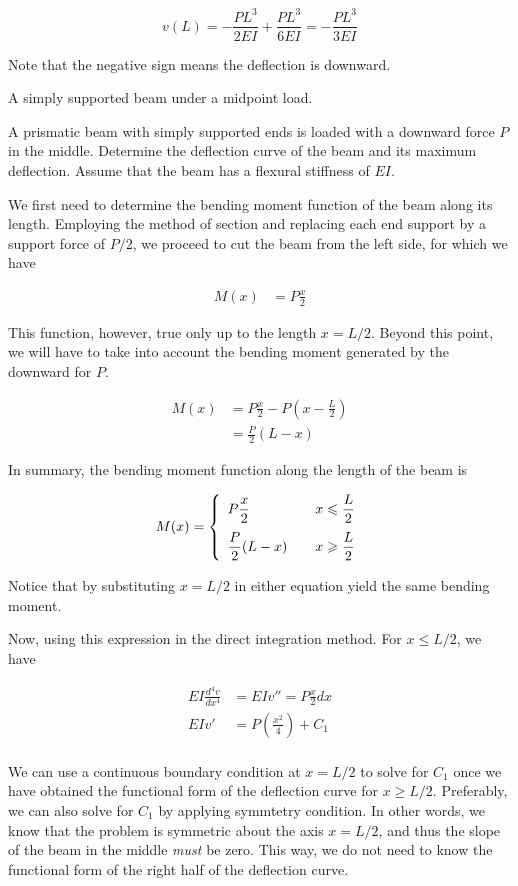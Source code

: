 \documentclass[a4paper,openany,12pt]{book}
\begin{document}
\begin{enumerate}
$$v(L) =  - \frac{PL^3}{2EI} + \frac{PL^3}{6EI} =  - \frac{PL^3}{3EI}$$

Note that the negative sign means the deflection is downward.

A simply supported beam under a midpoint load.

A prismatic beam with simply supported ends is loaded with a downward
force \(P\) in the middle. Determine the deflection curve of the beam and
its maximum deflection. Assume that the beam has a flexural stiffness of
\(EI\).


We first need to determine the bending moment function of the beam along
its length. Employing the method of section and replacing each end
support by a support force of \(P/2\), we proceed to cut the beam from the
left side, for which we have

$$\begin{aligned}
    M(x) &= P\frac{x}{2}
  \end{aligned}$$

This function, however, true only up to the length \(x = L/2\). Beyond
this point, we will have to take into account the bending moment
generated by the downward for \(P\).

$$\begin{aligned}
    M(x) &= P\frac{x}{2} - P(x-\frac{L}{2}) \\
         &= \frac{P}{2}(L-x)
  \end{aligned}$$

In summary, the bending moment function along the length of the beam is

$$M(x) = \left\{
      \begin{array}{l l l}
        P\dfrac{x}{2} & & x \leqslant \dfrac{L}{2} \\[1em]
        \dfrac{P}{2}(L-x) & & x \geqslant \dfrac{L}{2}
      \end{array} \right.$$

Notice that by substituting \(x = L/2\) in either equation yield the same
bending moment.

Now, using this expression in the direct integration method. For
\(x \leqslant L/2\), we have

$$\begin{aligned}
    EI \frac{d^4v}{dx^4} &= EIv'' = P\frac{x}{2}dx \\
    EIv' &= P (\frac{x^2}{4}) + C_1 \\
  \end{aligned}$$

We can use a continuous boundary condition at \(x = L/2\) to solve for
\(C_1\) once we have obtained the functional form of the deflection curve
for \(x \geqslant L/2\). Preferably, we can also solve for \(C_1\) by
applying symmtetry condition. In other words, we know that the problem
is symmetric about the axis \(x = L/2\), and thus the slope of the beam in
the middle \emph{must} be zero. This way, we do not need to know the
functional form of the right half of the deflection curve.


\end{enumerate}
\end{document}
